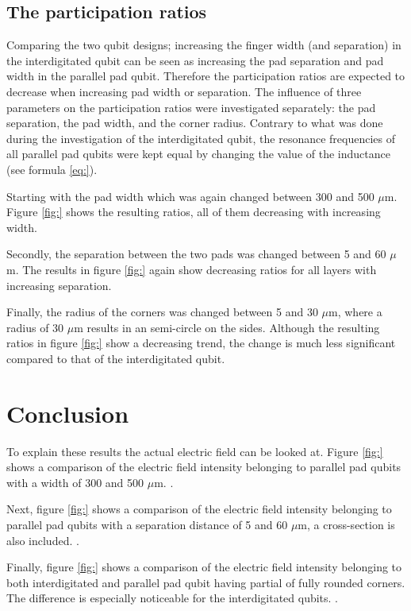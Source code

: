 \subsection{The participation ratios}
 Comparing the two qubit designs; increasing the finger width (and separation) in the interdigitated qubit can be seen as increasing the pad separation and pad width in the parallel pad qubit. Therefore the participation ratios are expected to decrease when increasing pad width or separation. The influence of three parameters on the participation ratios were investigated separately: the pad separation, the pad width, and the corner radius. Contrary to what was done during the investigation of the interdigitated qubit, the resonance frequencies of all parallel pad qubits were kept equal by changing the value of the inductance (see formula \eqref{eq:}). 
 
 Starting with the pad width which was again changed between 300 and 500 \(\mu\)m. Figure \ref{fig:} shows the resulting ratios, all of them decreasing with increasing width.
 
 Secondly, the separation between the two pads was changed between 5 and 60 \(\mu\)m. The results in figure \ref{fig:} again show decreasing ratios for all layers with increasing separation. 
 
 Finally, the radius of the corners was changed between 5 and 30 \(\mu\)m, where a radius of 30 \(\mu\)m results in an semi-circle on the sides. Although the resulting ratios in figure \ref{fig:} show a decreasing trend, the change is much less significant compared to that of the interdigitated qubit.
 
\section{Conclusion} %
To explain these results the actual electric field can be looked at. Figure \ref{fig:} shows a comparison of the electric field intensity belonging to parallel pad qubits with a width of 300 and 500 \(\mu\)m. .
 
Next, figure \ref{fig:} shows a comparison of the electric field intensity belonging to parallel pad qubits with a separation distance of 5 and 60 \(\mu\)m, a cross-section is also included. .
 
Finally, figure \ref{fig:} shows a comparison of the electric field intensity belonging to both interdigitated and parallel pad qubit having partial of fully rounded corners. The difference is especially noticeable for the interdigitated qubits. .
  




    